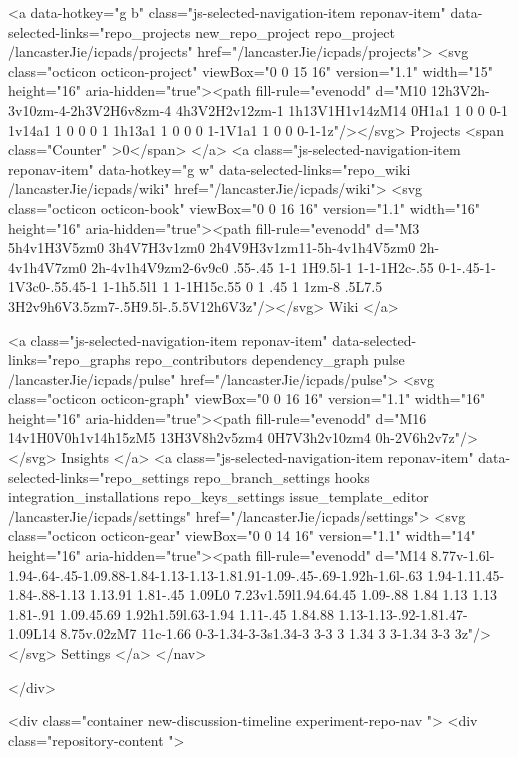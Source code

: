     <a data-hotkey="g b" class="js-selected-navigation-item reponav-item" data-selected-links="repo_projects new_repo_project repo_project /lancasterJie/icpads/projects" href="/lancasterJie/icpads/projects">
      <svg class="octicon octicon-project" viewBox="0 0 15 16" version="1.1" width="15" height="16" aria-hidden="true"><path fill-rule="evenodd" d="M10 12h3V2h-3v10zm-4-2h3V2H6v8zm-4 4h3V2H2v12zm-1 1h13V1H1v14zM14 0H1a1 1 0 0 0-1 1v14a1 1 0 0 0 1 1h13a1 1 0 0 0 1-1V1a1 1 0 0 0-1-1z"/></svg>
      Projects
      <span class="Counter" >0</span>
</a>
    <a class="js-selected-navigation-item reponav-item" data-hotkey="g w" data-selected-links="repo_wiki /lancasterJie/icpads/wiki" href="/lancasterJie/icpads/wiki">
      <svg class="octicon octicon-book" viewBox="0 0 16 16" version="1.1" width="16" height="16" aria-hidden="true"><path fill-rule="evenodd" d="M3 5h4v1H3V5zm0 3h4V7H3v1zm0 2h4V9H3v1zm11-5h-4v1h4V5zm0 2h-4v1h4V7zm0 2h-4v1h4V9zm2-6v9c0 .55-.45 1-1 1H9.5l-1 1-1-1H2c-.55 0-1-.45-1-1V3c0-.55.45-1 1-1h5.5l1 1 1-1H15c.55 0 1 .45 1 1zm-8 .5L7.5 3H2v9h6V3.5zm7-.5H9.5l-.5.5V12h6V3z"/></svg>
      Wiki
</a>

  <a class="js-selected-navigation-item reponav-item" data-selected-links="repo_graphs repo_contributors dependency_graph pulse /lancasterJie/icpads/pulse" href="/lancasterJie/icpads/pulse">
    <svg class="octicon octicon-graph" viewBox="0 0 16 16" version="1.1" width="16" height="16" aria-hidden="true"><path fill-rule="evenodd" d="M16 14v1H0V0h1v14h15zM5 13H3V8h2v5zm4 0H7V3h2v10zm4 0h-2V6h2v7z"/></svg>
    Insights
</a>
    <a class="js-selected-navigation-item reponav-item" data-selected-links="repo_settings repo_branch_settings hooks integration_installations repo_keys_settings issue_template_editor /lancasterJie/icpads/settings" href="/lancasterJie/icpads/settings">
      <svg class="octicon octicon-gear" viewBox="0 0 14 16" version="1.1" width="14" height="16" aria-hidden="true"><path fill-rule="evenodd" d="M14 8.77v-1.6l-1.94-.64-.45-1.09.88-1.84-1.13-1.13-1.81.91-1.09-.45-.69-1.92h-1.6l-.63 1.94-1.11.45-1.84-.88-1.13 1.13.91 1.81-.45 1.09L0 7.23v1.59l1.94.64.45 1.09-.88 1.84 1.13 1.13 1.81-.91 1.09.45.69 1.92h1.59l.63-1.94 1.11-.45 1.84.88 1.13-1.13-.92-1.81.47-1.09L14 8.75v.02zM7 11c-1.66 0-3-1.34-3-3s1.34-3 3-3 3 1.34 3 3-1.34 3-3 3z"/></svg>
      Settings
</a>
</nav>


  </div>

<div class="container new-discussion-timeline experiment-repo-nav  ">
  <div class="repository-content ">

